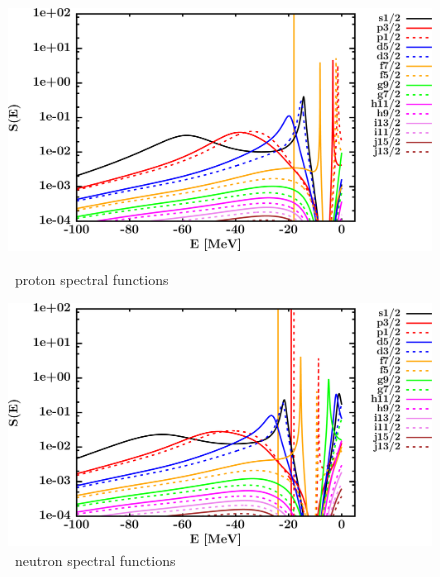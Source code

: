 \begin{figure}[hbtp]
    \centering
    \begin{minipage}{0.42\textwidth}
        \centering
        \includegraphics[width=\textwidth]{figures/ni58_protonSpectralFunctions.png}
        \caption*{\niEight\ proton spectral functions}
        \label{DOMFitData_ni58_proton_spectralFunctions}
    \end{minipage}\hspace{6pt}
    \begin{minipage}{0.42\textwidth}
        \centering
        \includegraphics[width=\linewidth]{figures/ni58_neutronSpectralFunctions.png}
        \caption*{\niEight\ neutron spectral functions}
        \label{DOMFitData_ni58_neutron_spectralFunctions}
    \end{minipage}
\end{figure}
\afterpage{\clearpage}
